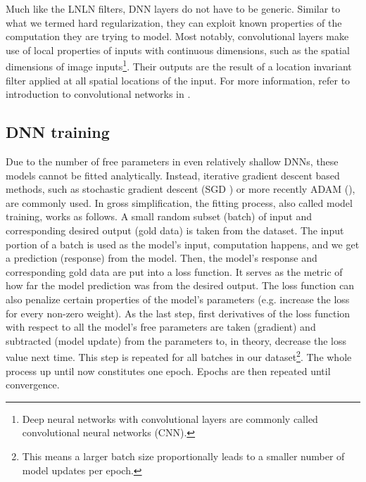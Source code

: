 
Much like the LNLN filters, DNN layers do not have to be generic. Similar to what we termed hard regularization, they can exploit known properties of the computation they are trying to model. Most notably, convolutional layers make use of local properties of inputs with continuous dimensions, such as the spatial dimensions of image inputs\footnote{Deep neural networks with convolutional layers are commonly called convolutional neural networks (CNN).}. Their outputs are the result of a location invariant filter applied at all spatial locations of the input. For more information, refer to introduction to convolutional networks in \cite{thesis_hojdar}.

\subsection{DNN training}\label{ch:1.3.2}

Due to the number of free parameters in even relatively shallow DNNs, these models cannot be fitted analytically. Instead, iterative gradient descent based methods, such as stochastic gradient descent (SGD \cite{kiefer1952}) or more recently ADAM (\cite{kingma2014adam}), are commonly used. In gross simplification, the fitting process, also called model training, works as follows. A small random subset (batch) of input and corresponding desired output (gold data) is taken from the dataset. The input portion of a batch is used as the model’s input, computation happens, and we get a prediction (response) from the model. Then, the model’s response and corresponding gold data are put into a loss function. It serves as the metric of how far the model prediction was from the desired output. The loss function can also penalize certain properties of the model’s parameters (e.g. increase the loss for every non-zero weight). As the last step, first derivatives of the loss function with respect to all the model’s free parameters are taken (gradient) and subtracted (model update) from the parameters to, in theory, decrease the loss value next time. This step is repeated for all batches in our dataset\footnote{This means a larger batch size proportionally leads to a smaller number of model updates per epoch.}. The whole process up until now constitutes one epoch. Epochs are then repeated until convergence.

